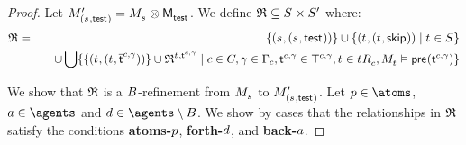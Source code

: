 \begin{proof}
Let $\kPModelP{(\kStateS, \aStateTest)} = \kPModel{\kStateS} \exec \aPModel{\aStateTest}$.
We define $\refinement \subseteq \kStates \times \kStatesP$ where:
\begin{eqnarray*}
\refinement &=& 
\{(\kStateS, (\kStateS, \aStateTest))\} \cup 
\{(\kStateT, (\kStateT, \aStateSkip)) \mid \kStateT \in \kStates\}  \\&&\quad \cup
\bigcup \{\{(\kStateT, (\kStateT, \aPStateT[\agentC, \gamma]))\} \cup \refinement^{\kStateT, \aStateT[\agentC, \gamma]} \mid \agentC \in \agentsC, \gamma \in \Gamma_\agentC, \aStateT[\agentC, \gamma] \in \aStatesT[\agentC, \gamma], \kStateT \in \kSuccessorsC{\kStateT}, \kPModel{\kStateT} \entails \aPrecondition(\aStateT[\agentC, \gamma])\}
\end{eqnarray*}

We show that $\mathfrak{R}$ is a $B$-refinement from $\kPModel{\kStateS}$ to $\kPModelP{(\kStateS, \aStateTest)}$.
Let $\atomP \in \atoms$, $\agentA \in \agents$ and $\agentD \in \agents \setminus \agentsB$.
We show by cases that the relationships in $\mathfrak{R}$ satisfy the conditions {\bf atoms-$p$}, {\bf forth-$d$}, and {\bf back-$a$}.


\end{proof}
